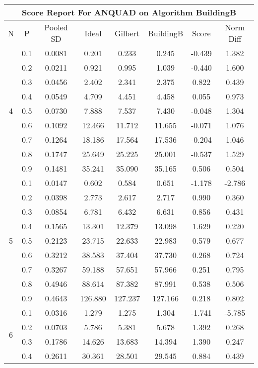 \documentclass[11pt,a4paper]{report}
\begin{document}
\begin{longtable}{ | c | c || c | c | c | c | c | c | }
\hline
\multicolumn{8}{|c|}{ Score Report For ANQUAD on Algorithm BuildingB} \\
\hline
N & P & Pooled SD &  Ideal &  Gilbert & BuildingB  & Score & Norm Diff \\
 \hline
 \hline
 \endhead
\multirow{9}{*}{4} & 0.1 & 0.0081 & 0.201 & 0.233 & 0.245 & -0.439 & 1.382 \\
 & 0.2 & 0.0211 & 0.921 & 0.995 & 1.039 & -0.440 & 1.600 \\
 & 0.3 & 0.0456 & 2.402 & 2.341 & 2.375 & 0.822 & 0.439 \\
 & 0.4 & 0.0549 & 4.709 & 4.451 & 4.458 & 0.055 & 0.973 \\
 & 0.5 & 0.0730 & 7.888 & 7.537 & 7.430 & -0.048 & 1.304 \\
 & 0.6 & 0.1092 & 12.466 & 11.712 & 11.655 & -0.071 & 1.076 \\
 & 0.7 & 0.1264 & 18.186 & 17.564 & 17.536 & -0.204 & 1.046 \\
 & 0.8 & 0.1747 & 25.649 & 25.225 & 25.001 & -0.537 & 1.529 \\
 & 0.9 & 0.1481 & 35.241 & 35.090 & 35.165 & 0.506 & 0.504 \\
 \hline
\multirow{9}{*}{5} & 0.1 & 0.0147 & 0.602 & 0.584 & 0.651 & -1.178 & -2.786 \\
 & 0.2 & 0.0398 & 2.773 & 2.617 & 2.717 & 0.990 & 0.360 \\
 & 0.3 & 0.0854 & 6.781 & 6.432 & 6.631 & 0.856 & 0.431 \\
 & 0.4 & 0.1565 & 13.301 & 12.379 & 13.098 & 1.629 & 0.220 \\
 & 0.5 & 0.2123 & 23.715 & 22.633 & 22.983 & 0.579 & 0.677 \\
 & 0.6 & 0.3212 & 38.583 & 37.404 & 37.730 & 0.268 & 0.724 \\
 & 0.7 & 0.3267 & 59.188 & 57.651 & 57.966 & 0.251 & 0.795 \\
 & 0.8 & 0.4946 & 88.614 & 87.382 & 87.991 & 0.538 & 0.506 \\
 & 0.9 & 0.4643 & 126.880 & 127.237 & 127.166 & 0.218 & 0.802 \\
 \hline
\multirow{9}{*}{6} & 0.1 & 0.0316 & 1.279 & 1.275 & 1.304 & -1.741 & -5.785 \\
 & 0.2 & 0.0703 & 5.786 & 5.381 & 5.678 & 1.392 & 0.268 \\
 & 0.3 & 0.1786 & 14.626 & 13.683 & 14.394 & 1.390 & 0.247 \\
 & 0.4 & 0.2611 & 30.361 & 28.501 & 29.545 & 0.884 & 0.439 \\

\end{longtable}
\end{document}
